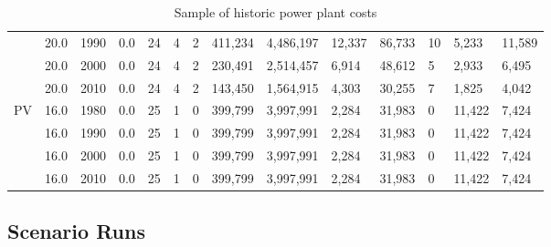 \begin{table}[]
\begin{tabular}{|l|l|l|l|l|l|l|l|l|l|l|l|l|l|}
		& 20.0 & 1990 & 0.0 & 24 & 4 & 2 & 411,234 & 4,486,197 & 12,337 & 86,733 & 10 & 5,233 & 11,589 \\ \cline{2-14} 
		& 20.0 & 2000 & 0.0 & 24 & 4 & 2 & 230,491 & 2,514,457 & 6,914 & 48,612 & 5 & 2,933 & 6,495 \\ \cline{2-14} 
		& 20.0 & 2010 & 0.0 & 24 & 4 & 2 & 143,450 & 1,564,915 & 4,303 & 30,255 & 7 & 1,825 & 4,042 \\ \hline
		\multirow{4}{*}{PV} & 16.0 & 1980 & 0.0 & 25 & 1 & 0 & 399,799 & 3,997,991 & 2,284 & 31,983 & 0 & 11,422 & 7,424 \\ \cline{2-14} 
		& 16.0 & 1990 & 0.0 & 25 & 1 & 0 & 399,799 & 3,997,991 & 2,284 & 31,983 & 0 & 11,422 & 7,424 \\ \cline{2-14} 
		& 16.0 & 2000 & 0.0 & 25 & 1 & 0 & 399,799 & 3,997,991 & 2,284 & 31,983 & 0 & 11,422 & 7,424 \\ \cline{2-14} 
		& 16.0 & 2010 & 0.0 & 25 & 1 & 0 & 399,799 & 3,997,991 & 2,284 & 31,983 & 0 & 11,422 & 7,424 \\ \hline
	\end{tabular}
	\label{table:historic_plant_costs}
	\caption{Sample of historic power plant costs}
\end{table}

\clearpage

\subsection{Scenario Runs}



